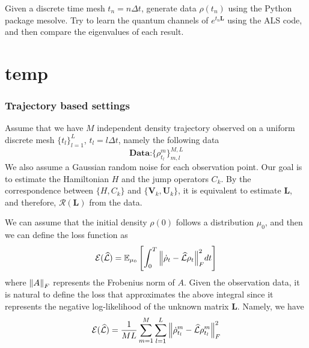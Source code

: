 \documentclass[10pt]{article}  %
\theoremstyle{plain}
\numberwithin{equation}{section}
\def\mL{\mathcal{L}}
\def\mE{\mathcal{E}}
\def\mR{\mathcal{R}}
\newcommand{\bL}{\mathbf{L}}
\newcommand{\bV}{\mathbf{V}}
\newcommand{\bU}{\mathbf{U}}
\begin{document}
Given a discrete time mesh $t_n = n \Delta t$, generate data $\rho(t_n)$ using the Python package mesolve. Try to learn the quantum channels of $e^{t_n\bL}$ using the ALS code, and then compare the eigenvalues of each result.

\appendix 


\section{temp}
\subsubsection{Trajectory based settings}
Assume that we have $M$ independent density trajectory observed on a uniform discrete mesh $\{t_l\}_{l = 1}^L$, $t_l = l \Delta t$, namely the following data
\begin{equation}
	\textbf{Data:} \{\rho^m_{t_l}\}_{m, l}^{M, L}
\end{equation}
We also assume a Gaussian random noise for each observation point. Our goal is to estimate the Hamiltonian $H$ and the jump operators $C_k$. By the correspondence between $\{H, C_k\}$ and $\{\bV_k, \bU_k\}$, it is equivalent to estimate $\bL$, and therefore, $\mR(\bL)$ from the data. 

We can assume that the initial density $\rho(0)$ follows a distribution $\mu_0$, and then we can define the loss function as
\begin{equation}
	\mE(\widehat{\mL}) = \mathbb{E}_{\mu_0}\left[\int_0^T \norm{\dot{\rho}_t - \widehat{\mL}\rho_t }_F^2 dt\right]
\end{equation}
where $\norm{A}_F$ represents the Frobenius norm of $A$. Given the observation data, it is natural to define the loss that approximates the above integral since it represents the negative log-likelihood of the unknown matrix $\bL$. Namely, we have 
\begin{equation}
	\mE(\widehat{\mL}) = \frac{1}{ML}\sum_{m = 1}^M\sum_{l = 1}^L \norm{\dot{\rho}^{m}_{t_l} - \widehat{\mL}\rho^m_{t_l} }_F^2
\end{equation}
\end{document}
